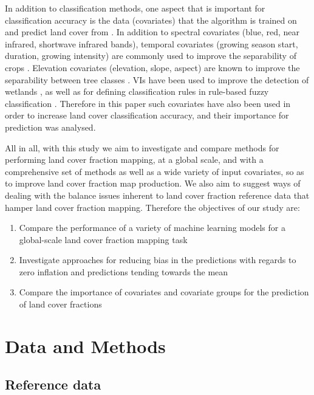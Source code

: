 \documentclass[a4paper,10pt]{article}
\begin{document}
In addition to classification methods, one aspect that is important for classification accuracy is the data (covariates) that the algorithm is trained on and predict land cover from \citep{yu2014metadiscoveries}. In addition to spectral covariates (blue, red, near infrared, shortwave infrared bands), temporal covariates (growing season start, duration, growing intensity) are commonly used to improve the separability of crops \citep{jakubauskas2001harmonic}. Elevation covariates (elevation, slope, aspect) are known to improve the separability between tree classes \citep{burrough2001fuzzy}. \Glspl{VI} have been used to improve the detection of wetlands \citep{sader1995wetlands}, as well as for defining classification rules in rule-based fuzzy classification \citep{baraldi2006rulebased}. Therefore in this paper such covariates have also been used in order to increase land cover classification accuracy, and their importance for prediction was analysed.

All in all, with this study we aim to investigate and compare methods for performing land cover fraction mapping, at a global scale, and with a comprehensive set of methods as well as a wide variety of input covariates, so as to improve land cover fraction map production.
We also aim to suggest ways of dealing with the balance issues inherent to land cover fraction reference data that hamper land cover fraction mapping.
Therefore the objectives of our study are:

\begin{enumerate}
 \item Compare the performance of a variety of machine learning models for a global-scale land cover fraction mapping task
 \item Investigate approaches for reducing bias in the predictions with regards to zero inflation and predictions tending towards the mean
 \item Compare the importance of covariates and covariate groups for the prediction of land cover fractions
\end{enumerate}


\section{Data and Methods}

\subsection{Reference data}
\end{document}
